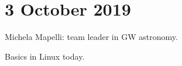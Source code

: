 \documentclass[main.tex]{subfiles}
\begin{document}
\section*{3 October 2019}

Michela Mapelli: team leader in GW astronomy.

Basics in Linux today.
\end{document}
